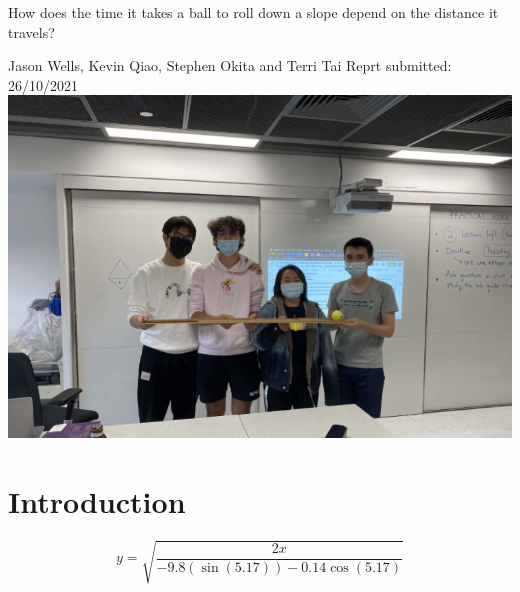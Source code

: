 \documentclass[12pt]{report}
\begin{document}
\begin{center}
    {\Large How does the time it takes a ball to roll down a slope depend on the distance it travels?}
    
    \vspace{1cm}
    {\large Jason Wells, Kevin Qiao, Stephen Okita and Terri Tai}
    {\large Reprt submitted: 26/10/2021}
    \vspace{2cm}
    \includegraphics[width=\textwidth]{Img.png}

\end{center}
\section{Introduction}


\[ y = \sqrt{\frac{2x}{-9.8(\sin(5.17))-0.14\cos(5.17)}}\]
\end{document}
